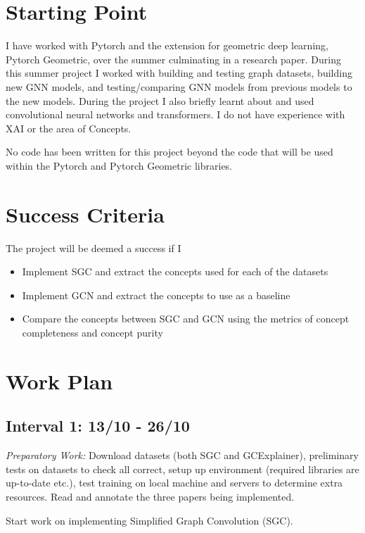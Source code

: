 \section{Starting Point}

I have worked with Pytorch and the extension for geometric deep learning, Pytorch Geometric, over the summer culminating in a research paper. During this summer project I worked with building and testing graph datasets, building new GNN models, and testing/comparing GNN models from previous models to the new models. During the project I also briefly learnt about and used convolutional neural networks and transformers. I do not have experience with XAI or the area of Concepts.

No code has been written for this project beyond the code that will be used within the Pytorch and Pytorch Geometric libraries.

\section{Success Criteria}

The project will be deemed a success if I 

\begin{itemize}[noitemsep]
    \item Implement SGC and extract the concepts used for each of the datasets
    \item Implement GCN and extract the concepts to use as a baseline
    \item Compare the concepts between SGC and GCN using the metrics of concept completeness and concept purity
\end{itemize}

\section{Work Plan}

\subsection{Interval 1: 13/10 - 26/10}

\textit{Preparatory Work:} Download datasets (both SGC and GCExplainer), preliminary tests on datasets to check all correct, setup up environment (required libraries are up-to-date etc.), test training on local machine and servers to determine extra resources. Read and annotate the three papers being implemented.

Start work on implementing Simplified Graph Convolution (SGC).

